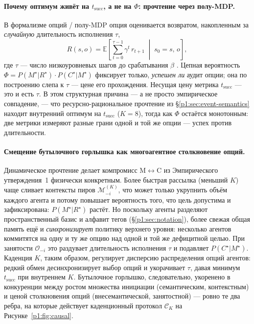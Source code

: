 \documentclass{article}
\begin{document}
\paragraph{Почему оптимум живёт на $t_{\mathrm{succ}}$, а не на $\Phi$: прочтение через полу-MDP.}
В формализме опций / полу-MDP опция оценивается
возвратом, накопленным за \emph{случайную} длительность исполнения $\tau$,
\[
R(s,o)=\mathbb{E}\!\left[\textstyle\sum_{t=0}^{\tau-1}\gamma^{t}\,r_{t+1}\;\middle|\;s_0=s,\,o\right],
\]
где $\tau$ --- число низкоуровневых шагов до срабатывания $\beta$
\citep{sutton1999between}. Цепная вероятность
$\Phi=P(M^\star|R^\star)\!\cdot\!P(C^\star|M^\star)$ фиксирует только,
\emph{успешен ли} аудит опции; она по построению слепа к
$\tau$ --- цене его прохождения. Несущая цену метрика
$t_{\mathrm{succ}}$ --- это и есть $\tau$. В этом структурная причина --- а не
просто эмпирическое совпадение, --- что ресурсно-рациональное прочтение из
\S\ref{p1:sec:event-semantics} \citep{lieder2020resource} находит
внутренний оптимум на $t_{\mathrm{succ}}$ ($K{=}8$), тогда как $\Phi$ остаётся
монотонным: две метрики измеряют разные грани одной и той же опции ---
успех против длительности.

\paragraph{Смещение бутылочного горлышка как многоагентное столкновение опций.}
Динамическое прочтение делает компромисс M$\leftrightarrow$C из
Эмпирического утверждения~1 физически конкретным. Более быстрая рассылка (меньший $K$)
чаще сливает контексты пиров $\mathcal{M}^{(K)}_{-i}$, что может только
укрупнить объём каждого агента и потому повышает вероятность того, что
цель допустима и зафиксирована: $P(M^\star|R^\star)$ растёт. Но
поскольку агенты разделяют пространственный базис и алфавит тегов
(\S\ref{p1:sec:notation}), более свежая общая память ещё и \emph{синхронизирует}
политику верхнего уровня: несколько агентов коммитятся на одну и ту же опцию над
одной и той же дефицитной целью. При занятости $\mathcal{O}_{-i}$ это раздувает
длительность исполнения $\tau$ и подавляет $P(C^\star|M^\star)$. Каденция
$K$, таким образом, регулирует дисперсию распределения опций агентов:
редкий обмен десинхронизирует выбор опций и укорачивает $\tau$,
давая минимум $t_{\mathrm{succ}}$ при внутреннем $K$. Бутылочное горлышко,
следовательно, укоренено в конкуренции между
ростом множества инициации (семантическим, контекстным) и ценой столкновения опций
(внесемантической, занятостной) --- ровно те два ребра, на которые действует каденционный протокол
$\mathcal{C}_K$ на Рисунке~\ref{p1:fig:causal}.
\end{document}
